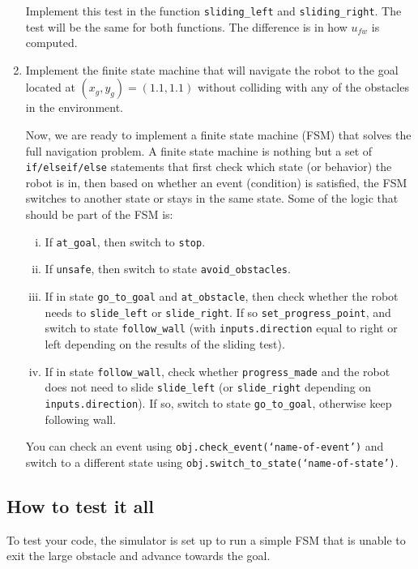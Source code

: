 \documentclass[10pt]{article}
\begin{document}
\begin{enumerate}
  Implement this test in the function \texttt{sliding\_left} and \texttt{sliding\_right}. The test will be the same for both functions. The difference is in how $u_{fw}$ is computed.
  \item Implement the finite state machine that will navigate the robot to the goal located at $(x_g,y_g)=(1.1,1.1)$ without colliding with any of the obstacles in the environment.
  
  Now, we are ready to implement a finite state machine (FSM) that solves the full navigation problem. A finite state machine is nothing but a set of \texttt{if/elseif/else} statements that first check which state (or behavior) the robot is in, then based on whether an event (condition) is satisfied, the FSM switches to another state or stays in the same state. Some of the logic that should be part of the FSM is:
  
  \begin{enumerate}[(i)]
    \item If \texttt{at\_goal}, then switch to \texttt{stop}.
    \item If \texttt{unsafe}, then switch to state \texttt{avoid\_obstacles}.
    \item If in state \texttt{go\_to\_goal} and \texttt{at\_obstacle}, then check whether the robot needs to \texttt{slide\_left} or \texttt{slide\_right}. If so \texttt{set\_progress\_point}, and switch to state \texttt{follow\_wall} (with \texttt{inputs.direction} equal to right or left depending on the results of the sliding test).
    \item If in state \texttt{follow\_wall}, check whether \texttt{progress\_made} and the robot does not need to slide \texttt{slide\_left} (or \texttt{slide\_right} depending on \texttt{inputs.direction}). If so, switch to state \texttt{go\_to\_goal}, otherwise keep following wall.
  \end{enumerate}
  
  You can check an event using \texttt{obj.check\_event(`name-of-event')} and switch to a different state using \texttt{obj.switch\_to\_state(`name-of-state')}.
\end{enumerate}

\subsection*{How to test it all}
To test your code, the simulator is set up to run a simple FSM that is unable to exit the large obstacle and advance towards the goal.
\end{document}
